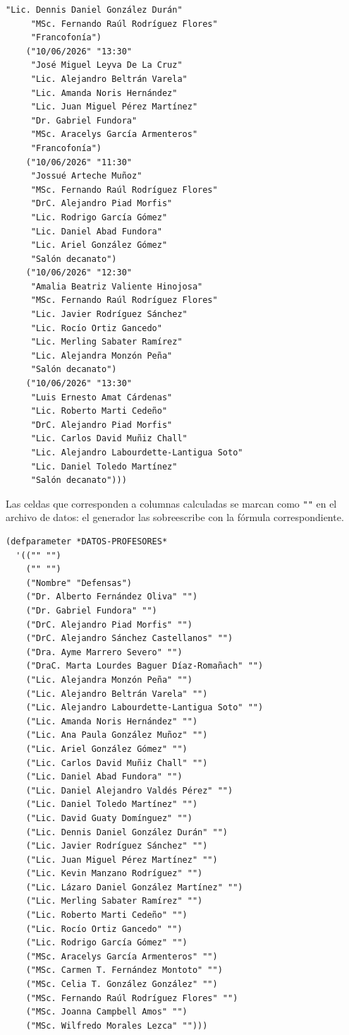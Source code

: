 \documentclass[12pt,a4paper]{report}
\begin{document}
\begin{lstlisting}[caption={Datos de defensas-table (13 defensas).}]
     "Lic. Dennis Daniel González Durán"
     "MSc. Fernando Raúl Rodríguez Flores"
     "Francofonía")
    ("10/06/2026" "13:30"
     "José Miguel Leyva De La Cruz"
     "Lic. Alejandro Beltrán Varela"
     "Lic. Amanda Noris Hernández"
     "Lic. Juan Miguel Pérez Martínez"
     "Dr. Gabriel Fundora"
     "MSc. Aracelys García Armenteros"
     "Francofonía")
    ("10/06/2026" "11:30"
     "Jossué Arteche Muñoz"
     "MSc. Fernando Raúl Rodríguez Flores"
     "DrC. Alejandro Piad Morfis"
     "Lic. Rodrigo García Gómez"
     "Lic. Daniel Abad Fundora"
     "Lic. Ariel González Gómez"
     "Salón decanato")
    ("10/06/2026" "12:30"
     "Amalia Beatriz Valiente Hinojosa"
     "MSc. Fernando Raúl Rodríguez Flores"
     "Lic. Javier Rodríguez Sánchez"
     "Lic. Rocío Ortiz Gancedo"
     "Lic. Merling Sabater Ramírez"
     "Lic. Alejandra Monzón Peña"
     "Salón decanato")
    ("10/06/2026" "13:30"
     "Luis Ernesto Amat Cárdenas"
     "Lic. Roberto Marti Cedeño"
     "DrC. Alejandro Piad Morfis"
     "Lic. Carlos David Muñiz Chall"
     "Lic. Alejandro Labourdette-Lantigua Soto"
     "Lic. Daniel Toledo Martínez"
     "Salón decanato")))
\end{lstlisting}

Las celdas que corresponden a columnas calculadas se marcan como
\texttt{""} en el archivo de datos: el generador las sobreescribe con
la fórmula correspondiente.

\begin{lstlisting}[caption={Datos de profesores-table (32 profesores).}]
(defparameter *DATOS-PROFESORES*
  '(("" "")
    ("" "")
    ("Nombre" "Defensas")
    ("Dr. Alberto Fernández Oliva" "")
    ("Dr. Gabriel Fundora" "")
    ("DrC. Alejandro Piad Morfis" "")
    ("DrC. Alejandro Sánchez Castellanos" "")
    ("Dra. Ayme Marrero Severo" "")
    ("DraC. Marta Lourdes Baguer Díaz-Romañach" "")
    ("Lic. Alejandra Monzón Peña" "")
    ("Lic. Alejandro Beltrán Varela" "")
    ("Lic. Alejandro Labourdette-Lantigua Soto" "")
    ("Lic. Amanda Noris Hernández" "")
    ("Lic. Ana Paula González Muñoz" "")
    ("Lic. Ariel González Gómez" "")
    ("Lic. Carlos David Muñiz Chall" "")
    ("Lic. Daniel Abad Fundora" "")
    ("Lic. Daniel Alejandro Valdés Pérez" "")
    ("Lic. Daniel Toledo Martínez" "")
    ("Lic. David Guaty Domínguez" "")
    ("Lic. Dennis Daniel González Durán" "")
    ("Lic. Javier Rodríguez Sánchez" "")
    ("Lic. Juan Miguel Pérez Martínez" "")
    ("Lic. Kevin Manzano Rodríguez" "")
    ("Lic. Lázaro Daniel González Martínez" "")
    ("Lic. Merling Sabater Ramírez" "")
    ("Lic. Roberto Marti Cedeño" "")
    ("Lic. Rocío Ortiz Gancedo" "")
    ("Lic. Rodrigo García Gómez" "")
    ("MSc. Aracelys García Armenteros" "")
    ("MSc. Carmen T. Fernández Montoto" "")
    ("MSc. Celia T. González González" "")
    ("MSc. Fernando Raúl Rodríguez Flores" "")
    ("MSc. Joanna Campbell Amos" "")
    ("MSc. Wilfredo Morales Lezca" "")))
\end{lstlisting}
\end{document}
